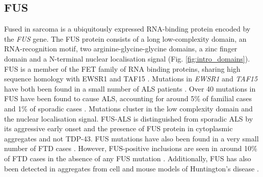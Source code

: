 %
%
%
%
%






\subsection{FUS}

Fused in sarcoma is a ubiquitously expressed RNA-binding protein encoded by the \textit{FUS} gene. 
The FUS protein consists of a long low-complexity domain, an RNA-recognition motif, two arginine-glycine-glycine domains, a zinc finger domain and a N-terminal nuclear localisation signal (Fig. \ref{fig:intro_domains}).
FUS is a member of the FET family of RNA binding proteins, sharing high sequence homology with EWSR1 and TAF15 \citep{Kovar2011}.
Mutations in \textit{EWSR1} and \textit{TAF15} have both been found in a small number of ALS patients \citep{Neumann2011, Couthouis2011,Ticozzi2011,Couthouis2012}.
Over 40 mutations in FUS have been found to cause ALS, accounting for around 5\% of familial cases and 1\% of sporadic cases \citep{Vance2009-ye,Kwiatkowski2009}.  
Mutations cluster in the low complexity domain and the nuclear localisation signal.
FUS-ALS is distinguished from sporadic ALS by its aggressive early onset and the presence of FUS protein in cytoplasmic aggregates and not TDP-43. 
FUS mutations have also been found in a very small number of FTD cases \citep{VanLangenhove2010,Broustal2010}.
However, FUS-positive inclusions are seen in around 10\% of FTD cases in the absence of any FUS mutation \citep{Neumann2009}. 
Additionally, FUS has also been detected in aggregates from cell and mouse models of Huntington's disease \citep{Doi2008, Kino2016}.

